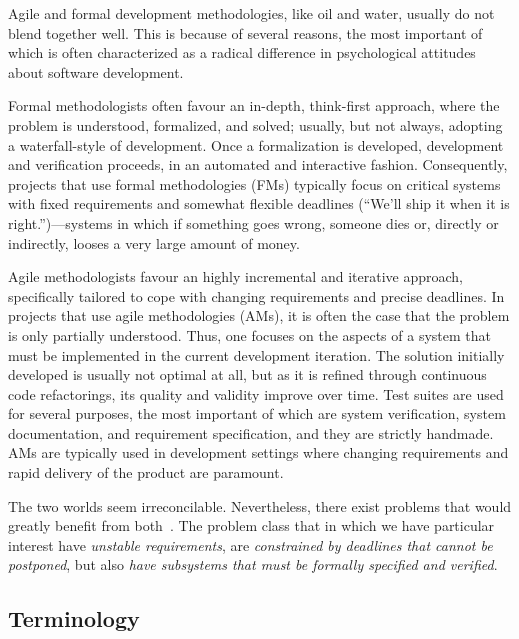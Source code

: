 \documentclass[english]{lni}
\begin{document}

Agile and formal development methodologies, like oil and water,
usually do not blend together well.  This is because of several
reasons, the most important of which is often characterized as a
radical difference in psychological attitudes about software
development.  

Formal methodologists often favour an in-depth, think-first approach,
where the problem is understood, formalized, and solved; usually, but
not always, adopting a waterfall-style of development.  Once a
formalization is developed, development and verification proceeds, in
an automated and interactive fashion.  Consequently, projects that use
formal methodologies (FMs) typically focus on critical systems with
fixed requirements and somewhat flexible deadlines (``We'll ship it
when it is right.'')---systems in which if something goes wrong,
someone dies or, directly or indirectly, looses a very large amount of
money.

Agile methodologists favour an highly incremental and iterative
approach, specifically tailored to cope with changing requirements and
precise deadlines.  In projects that use agile methodologies (AMs), it is
often the case that the problem is only partially understood.  Thus,
one focuses on the aspects of a system that must be implemented in the
current development iteration.  The solution initially developed is
usually not optimal at all, but as it is refined through continuous
code refactorings, its quality and validity improve over time.  Test
suites are used for several purposes, the most important of which are
system verification, system documentation, and requirement
specification, and they are strictly handmade.  AMs are typically used
in development settings where changing requirements and rapid delivery
of the product are paramount.


The two worlds seem irreconcilable.  Nevertheless, there exist
problems that would greatly benefit from both~\cite{Black2009}.  The
problem class that in which we have particular interest have
\emph{unstable requirements}, are \emph{constrained by deadlines that
  cannot be postponed}, but also \emph{have subsystems that must be
  formally specified and verified}.


\subsection{Terminology}
\label{sec:terminology}
\end{document}
